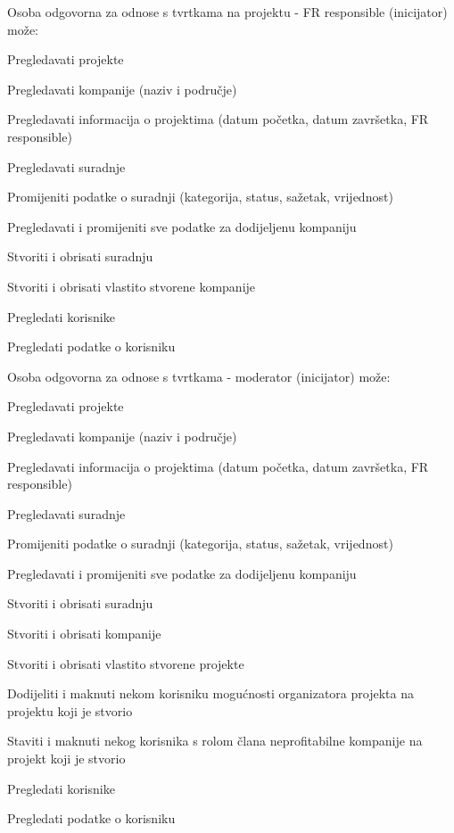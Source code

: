\begin{packed_enum}
\begin{packed_enum}
				\end{packed_enum}

				\item {Osoba odgovorna za odnose s tvrtkama na projektu - FR responsible (inicijator) može:}

				\begin{packed_enum}

					\item Pregledavati projekte
					\item Pregledavati kompanije (naziv i područje)
					\item Pregledavati informacija o projektima (datum početka, datum završetka, FR responsible)
					\item Pregledavati suradnje
					\item Promijeniti podatke o suradnji (kategorija, status, sažetak, vrijednost)
					\item Pregledavati i promijeniti sve podatke za dodijeljenu kompaniju
					\item Stvoriti i obrisati suradnju
					\item Stvoriti i obrisati vlastito stvorene kompanije
					\item Pregledati korisnike
					\item Pregledati podatke o korisniku

				\end{packed_enum}

				\item {Osoba odgovorna za odnose s tvrtkama - moderator (inicijator) može:}

				\begin{packed_enum}

					\item Pregledavati projekte
					\item Pregledavati kompanije (naziv i područje)
					\item Pregledavati informacija o projektima (datum početka, datum završetka, FR responsible)
					\item Pregledavati suradnje
					\item Promijeniti podatke o suradnji (kategorija, status, sažetak, vrijednost)
					\item Pregledavati i promijeniti sve podatke za dodijeljenu kompaniju
					\item Stvoriti i obrisati suradnju
					\item Stvoriti i obrisati kompanije
					\item Stvoriti i obrisati vlastito stvorene projekte
					\item Dodijeliti i maknuti nekom korisniku mogućnosti organizatora projekta na projektu koji je stvorio
					\item Staviti i maknuti nekog korisnika s rolom člana neprofitabilne kompanije na projekt koji je stvorio
					\item Pregledati korisnike
					\item Pregledati podatke o korisniku


\end{packed_enum}
\end{packed_enum}

